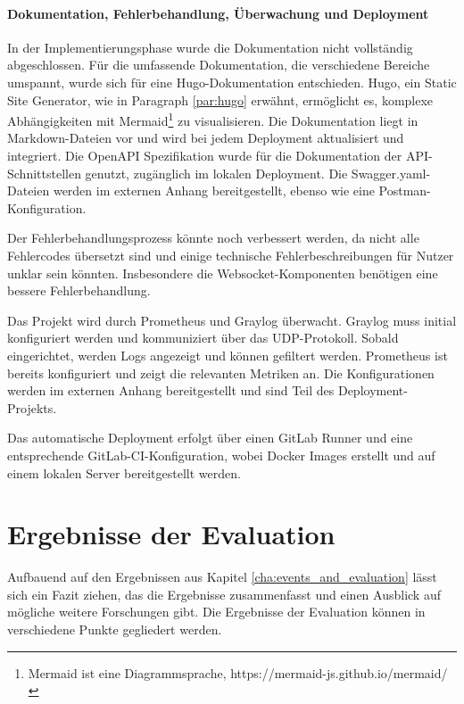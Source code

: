 \paragraph*{Dokumentation, Fehlerbehandlung, Überwachung und Deployment}
In der Implementierungsphase wurde die Dokumentation nicht vollständig abgeschlossen. Für die umfassende Dokumentation, die verschiedene Bereiche umspannt, wurde sich für eine Hugo-Dokumentation 
entschieden. Hugo, ein Static Site Generator, wie in Paragraph \ref{par:hugo} erwähnt, ermöglicht es, komplexe Abhängigkeiten mit Mermaid\footnote{Mermaid ist eine Diagrammsprache, https://mermaid-js.github.io/mermaid/} 
zu visualisieren. Die Dokumentation liegt in Markdown-Dateien vor und wird bei jedem Deployment aktualisiert und integriert. Die OpenAPI Spezifikation wurde für die Dokumentation der 
API-Schnittstellen genutzt, zugänglich im lokalen Deployment. Die Swagger.yaml-Dateien werden im externen Anhang bereitgestellt, ebenso wie eine Postman-Konfiguration.

Der Fehlerbehandlungsprozess könnte noch verbessert werden, da nicht alle Fehlercodes übersetzt sind und einige technische Fehlerbeschreibungen für Nutzer unklar sein könnten. Insbesondere 
die Websocket-Komponenten benötigen eine bessere Fehlerbehandlung.

Das Projekt wird durch Prometheus und Graylog überwacht. Graylog muss initial konfiguriert werden und kommuniziert über das UDP-Protokoll. Sobald eingerichtet, werden Logs angezeigt und können 
gefiltert werden. Prometheus ist bereits konfiguriert und zeigt die relevanten Metriken an. Die Konfigurationen werden im externen Anhang bereitgestellt und sind Teil des Deployment-Projekts.

Das automatische Deployment erfolgt über einen GitLab Runner und eine entsprechende GitLab-CI-Konfiguration, wobei Docker Images erstellt und auf einem lokalen Server bereitgestellt werden.



\section{Ergebnisse der Evaluation}
Aufbauend auf den Ergebnissen aus Kapitel \ref{cha:events_and_evaluation} lässt sich ein Fazit ziehen, das die Ergebnisse zusammenfasst und einen Ausblick auf mögliche weitere Forschungen gibt.
Die Ergebnisse der Evaluation können in verschiedene Punkte gegliedert werden.

